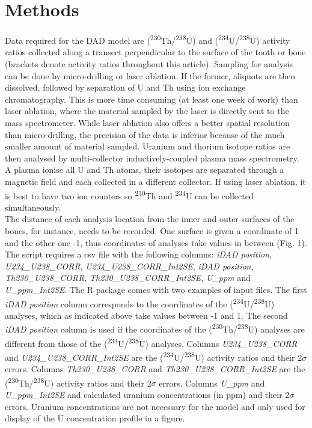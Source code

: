 \documentclass[]{article}
\begin{document}
\hypertarget{methods}{%
\section{Methods}\label{methods}}

Data required for the DAD model are
(\textsuperscript{230}Th/\textsuperscript{238}U) and
(\textsuperscript{234}U/\textsuperscript{238}U) activity ratios
collected along a transect perpendicular to the surface of the tooth or
bone (brackets denote activity ratios throughout this article). Sampling
for analysis can be done by micro-drilling or laser ablation. If the
former, aliquots are then dissolved, followed by separation of U and Th
using ion exchange chromatography. This is more time consuming (at least
one week of work) than laser ablation, where the material sampled by the
laser is directly sent to the mass spectrometer. While laser ablation
also offers a better spatial resolution than micro-drilling, the
precision of the data is inferior because of the much smaller amount of
material sampled. Uranium and thorium isotope ratios are then analysed
by multi-collector inductively-coupled plasma mass spectrometry. A
plasma ionise all U and Th atoms, their isotopes are separated through a
magnetic field and each collected in a different collector. If using
laser ablation, it is best to have two ion counters so
\textsuperscript{230}Th and \textsuperscript{234}U can be collected
simultaneously.\\
The distance of each analysis location from the inner and outer surfaces
of the bones, for instance, needs to be recorded. One surface is given a
coordinate of 1 and the other one -1, thus coordinates of analyses take
values in between (Fig. 1). The script requires a csv file with the
following columns: \emph{iDAD position}, \emph{U234\_U238\_CORR},
\emph{U234\_U238\_CORR\_Int2SE}, \emph{iDAD position},
\emph{Th230\_U238\_CORR}, \emph{Th230\_U238\_CORR\_Int2SE},
\emph{U\_ppm} and \emph{U\_ppm\_Int2SE}. The R package comes with two
examples of input files. The first \emph{iDAD position} column
corresponds to the coordinates of the
(\textsuperscript{234}U/\textsuperscript{238}U) analyses, which as
indicated above take values between -1 and 1. The second \emph{iDAD
position} column is used if the coordinates of the
(\textsuperscript{230}Th/\textsuperscript{238}U) analyses are different
from those of the (\textsuperscript{234}U/\textsuperscript{238}U)
analyses. Columns \emph{U234\_U238\_CORR} and
\emph{U234\_U238\_CORR\_Int2SE} are the
(\textsuperscript{234}U/\textsuperscript{238}U) activity ratios and
their 2\(\sigma\) errors. Columns \emph{Th230\_U238\_CORR} and
\emph{Th230\_U238\_CORR\_Int2SE} are the
(\textsuperscript{230}Th/\textsuperscript{238}U) activity ratios and
their 2\(\sigma\) errors. Columns \emph{U\_ppm} and
\emph{U\_ppm\_Int2SE} and calculated uranium concentrations (in ppm) and
their 2\(\sigma\) errors. Uranium concentrations are not necessary for
the model and only used for display of the U concentration profile in a
figure.
\end{document}
